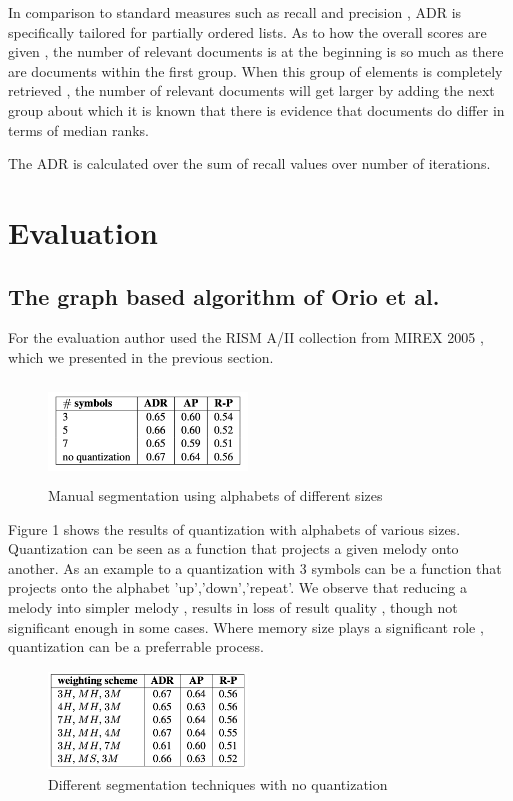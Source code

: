 \documentclass{llncs}
\begin{document}
			In comparison to standard measures such as recall and precision , ADR is specifically tailored for partially ordered lists. As to how the overall scores are given , the number of relevant documents is at the beginning is so much as there are documents within the first group. When this group of elements is completely retrieved , the number of relevant documents will get larger by adding the next group about which it is known that there is evidence that documents do differ in terms of median ranks.

			The ADR is calculated over the sum of recall values over number of iterations.     

	\section{Evaluation}
		\subsection{The graph based algorithm of Orio et al.}
			For the evaluation author used the RISM A/II collection from MIREX 2005  , which we  presented in the previous section.


			\begin{figure}[h!]
			\centering
			\includegraphics[width=200px,height=100px,keepaspectratio]{one_of_two_point_four}
			\caption{Manual segmentation using alphabets of different sizes \cite{two_point_four}}
			\end{figure}


			Figure 1 shows the results of quantization with alphabets of various sizes. Quantization can be seen as a function that projects a given melody onto another. As an example to a quantization with 3 symbols can be a function that projects onto the alphabet {'up','down','repeat'}. We observe that reducing a melody into simpler melody , results in loss of result quality , though not significant enough in some cases. Where memory size plays a significant role , quantization can be a preferrable process.   

			\begin{figure}[h!]
			\centering
			\includegraphics[width=200px,height=100px,keepaspectratio]{three_of_two_point_four}
			\caption{Different segmentation techniques with no quantization \cite{two_point_four}}
			\end{figure}
\end{document}
